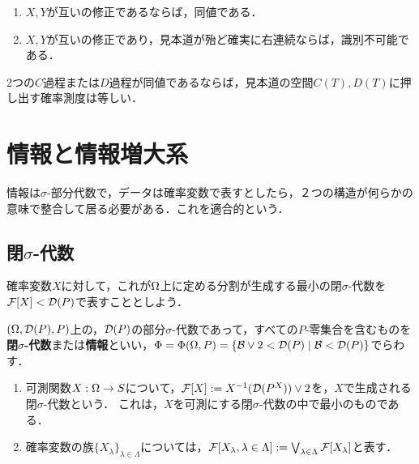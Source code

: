 \documentclass[uplatex,dvipdfmx]{jsreport}
\begin{document}
\begin{lemma}\mbox{}
    \begin{enumerate}
        \item $X,Y$が互いの修正であるならば，同値である．
        \item $X,Y$が互いの修正であり，見本道が殆ど確実に右連続ならば，識別不可能である．
    \end{enumerate}
\end{lemma}

\begin{theorem}
    2つの$C$過程または$D$過程が同値であるならば，見本道の空間$C(T),D(T)$に押し出す確率測度は等しい．
\end{theorem}

\section{情報と情報増大系}

\begin{tcolorbox}[colframe=ForestGreen, colback=ForestGreen!10!white,breakable,colbacktitle=ForestGreen!40!white,coltitle=black,fonttitle=\bfseries\sffamily,
title=]
    情報は$\sigma$-部分代数で，データは確率変数で表すとしたら，２つの構造が何らかの意味で整合して居る必要がある．これを適合的という．
\end{tcolorbox}

\subsection{閉$\sigma$-代数}

\begin{tcolorbox}[colframe=ForestGreen, colback=ForestGreen!10!white,breakable,colbacktitle=ForestGreen!40!white,coltitle=black,fonttitle=\bfseries\sffamily,
title=]
    確率変数$X$に対して，これが$\Omega$上に定める分割が生成する最小の閉$\sigma$-代数を$\mathcal{F}[X]<\mathcal{D}(P)$で表すこととしよう．
\end{tcolorbox}

\begin{notation}
    $(\Omega,\mathcal{D}(P),P)$上の，$\mathcal{D}(P)$の部分$\sigma$-代数であって，すべての$P$-零集合を含むものを\textbf{閉$\sigma$-代数}または\textbf{情報}といい，$\Phi=\Phi(\Omega,P)=\left\{\mathcal{B}\lor2<\mathcal{D}(P)\mid\mathcal{B}<\mathcal{D}(P)\right\}$でらわす．
\end{notation}

\begin{definition}\mbox{}
    \begin{enumerate}
        \item 可測関数$X:\Omega\to S$について，$\mathcal{F}[X]:=X^{-1}(\mathcal{D}(P^X))\lor 2$を，$X$で生成される閉$\sigma$-代数という．
        これは，$X$を可測にする閉$\sigma$-代数の中で最小のものである．
        \item 確率変数の族$\{X_\lambda\}_{\lambda\in\Lambda}$については，$\mathcal{F}[X_\lambda,\lambda\in\Lambda]:=\bigvee_{\lambda\in\Lambda}\mathcal{F}[X_\lambda]$と表す．
    \end{enumerate}
\end{definition}
\end{document}
